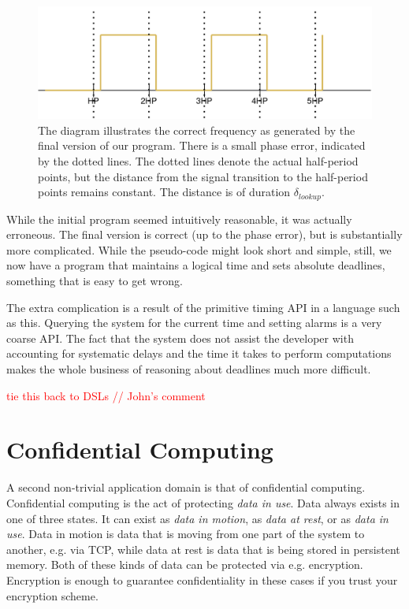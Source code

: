 \begin{figure}
    \centering
    \includegraphics[scale=0.2]{graphics/phase-error.png}
    \caption{The diagram illustrates the correct frequency as generated by the final version of our program. There is
    a small phase error, indicated by the dotted lines. The dotted lines denote the actual half-period points, but
    the distance from the signal transition to the half-period points remains constant. The distance is of duration
    $\delta_{lookup}$.}
    \label{graphics:phase-error}
\end{figure}

While the initial program seemed intuitively reasonable, it was actually erroneous. The final version is
correct (up to the phase error), but is substantially more complicated. While the pseudo-code might look short and
simple, still, we now have a program that maintains a logical time and sets absolute deadlines, something that is easy
to get wrong.

The extra complication is a result of the primitive timing API in a language such as this. Querying the system for the current
time and setting alarms is a very coarse API. The fact that the system does not assist the developer with accounting for
systematic delays and the time it takes to perform computations makes the whole business of reasoning about deadlines much more difficult.

\textcolor{red}{tie this back to DSLs // John's comment}

\section{Confidential Computing}

A second non-trivial application domain is that of confidential computing. Confidential computing is the act of protecting
\textit{data in use}.
Data always exists in one of three states. It can exist as \textit{data in motion}, as \textit{data at rest}, or as
\textit{data in use}. Data in motion is data that is moving from one part of the system to another, e.g. via TCP, while data at rest
is data that is being stored in persistent memory. Both of these kinds of data can be protected via e.g. encryption.
Encryption is enough to guarantee confidentiality in these cases if you trust your encryption scheme.

